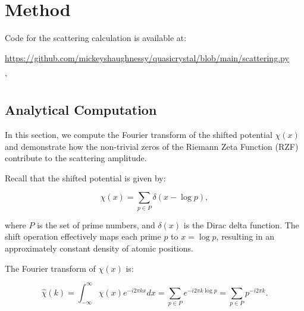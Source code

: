 \documentclass[11pt, oneside]{article}
\begin{document}
\section{Method}

Code for the scattering calculation is available at:
 
\url{https://github.com/mickeyshaughnessy/quasicrystal/blob/main/scattering.py}

'
% 
%

\subsection{Analytical Computation}

In this section, we compute the Fourier transform of the shifted potential $\chi(x)$ and demonstrate how the non-trivial zeros of the Riemann Zeta Function (RZF) contribute to the scattering amplitude.

Recall that the shifted potential is given by:

\begin{equation}
\chi(x) = \sum_{p \in P} \delta\left(x - \log p\right),
\end{equation}

where $P$ is the set of prime numbers, and $\delta(x)$ is the Dirac delta function. The shift operation effectively maps each prime $p$ to $x = \log p$, resulting in an approximately constant density of atomic positions.

The Fourier transform of $\chi(x)$ is:

\begin{equation}
\hat{\chi}(k) = \int_{-\infty}^{\infty} \chi(x) e^{-i 2\pi k x} dx = \sum_{p \in P} e^{-i 2\pi k \log p} = \sum_{p \in P} p^{-i 2\pi k}.
\end{equation}
\end{document}
